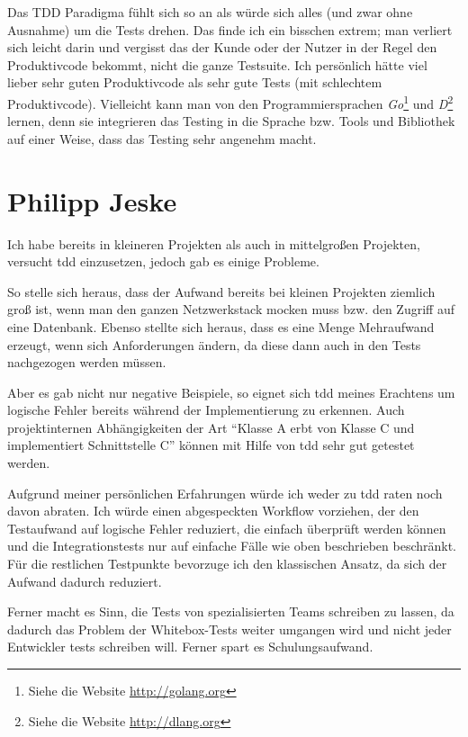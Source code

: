 \documentclass{mitschrift}
\newcommand{\pje}{\marginpar{Philipp\\Jeske}}
\begin{document}
Das TDD Paradigma fühlt sich so an als würde sich alles (und zwar ohne
Ausnahme) um die Tests drehen. Das finde ich ein bisschen extrem; man verliert
sich leicht darin und vergisst das der Kunde oder der Nutzer in der Regel den
Produktivcode bekommt, nicht die ganze Testsuite. Ich persönlich hätte viel
lieber sehr guten Produktivcode als sehr gute Tests (mit schlechtem
Produktivcode). Vielleicht kann man von den Programmiersprachen
\emph{Go}\footnote{Siehe die Website \url{http://golang.org}} und
\emph{D}\footnote{Siehe die Website \url{http://dlang.org}} lernen, denn
sie integrieren das Testing in die Sprache bzw. Tools und Bibliothek auf einer
Weise, dass das Testing sehr angenehm macht.

\section{Philipp Jeske}\label{Erfahrungsbericht Philipp}\pje
Ich habe bereits in kleineren Projekten als auch in mittelgroßen Projekten,
versucht \gls{tdd} einzusetzen, jedoch gab es einige Probleme.

So stelle sich heraus, dass der Aufwand bereits bei kleinen Projekten ziemlich
groß ist, wenn man den ganzen Netzwerkstack mocken muss bzw. den Zugriff auf
eine Datenbank. Ebenso stellte sich heraus, dass es eine Menge Mehraufwand
erzeugt, wenn sich Anforderungen ändern, da diese dann auch in den Tests
nachgezogen werden müssen.

Aber es gab nicht nur negative Beispiele, so eignet sich \gls{tdd} meines
Erachtens um logische Fehler bereits während der Implementierung zu erkennen.
Auch projektinternen Abhängigkeiten der Art "`Klasse A erbt von
Klasse C und implementiert Schnittstelle C"' können mit Hilfe von \gls{tdd}
sehr gut getestet werden.

Aufgrund meiner persönlichen Erfahrungen würde ich weder zu \gls{tdd} raten
noch davon abraten. Ich würde einen abgespeckten Workflow vorziehen, der den
Testaufwand auf logische Fehler reduziert, die einfach überprüft werden können
und die Integrationstests nur auf einfache Fälle wie oben beschrieben
beschränkt. Für die restlichen Testpunkte bevorzuge ich den klassischen Ansatz,
da sich der Aufwand dadurch reduziert.

Ferner macht es Sinn, die Tests von spezialisierten Teams schreiben zu lassen,
da dadurch das Problem der Whitebox-Tests weiter umgangen wird und nicht jeder
Entwickler tests schreiben will. Ferner spart es Schulungsaufwand.

\printbibliography
%
%

\printglossary
\end{document}
